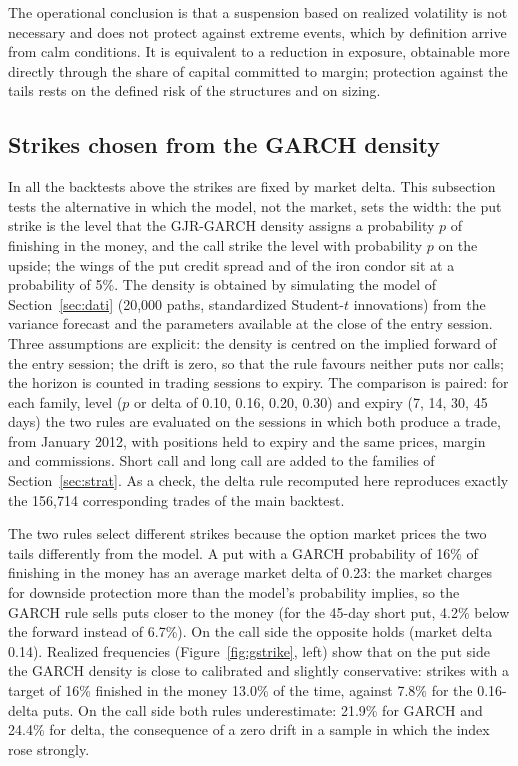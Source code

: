 \documentclass[11pt,a4paper]{article}
\begin{document}
The operational conclusion is that a suspension based on realized volatility is not necessary and does not protect against extreme events, which by definition arrive from calm conditions. It is equivalent to a reduction in exposure, obtainable more directly through the share of capital committed to margin; protection against the tails rests on the defined risk of the structures and on sizing.

\subsection{Strikes chosen from the GARCH density}\label{sec:gstrike}

In all the backtests above the strikes are fixed by market delta. This subsection tests the alternative in which the model, not the market, sets the width: the put strike is the level that the GJR-GARCH density assigns a probability $p$ of finishing in the money, and the call strike the level with probability $p$ on the upside; the wings of the put credit spread and of the iron condor sit at a probability of 5\%. The density is obtained by simulating the model of Section~\ref{sec:dati} (20,000 paths, standardized Student-$t$ innovations) from the variance forecast and the parameters available at the close of the entry session. Three assumptions are explicit: the density is centred on the implied forward of the entry session; the drift is zero, so that the rule favours neither puts nor calls; the horizon is counted in trading sessions to expiry. The comparison is paired: for each family, level ($p$ or delta of 0.10, 0.16, 0.20, 0.30) and expiry (7, 14, 30, 45 days) the two rules are evaluated on the sessions in which both produce a trade, from January 2012, with positions held to expiry and the same prices, margin and commissions. Short call and long call are added to the families of Section~\ref{sec:strat}. As a check, the delta rule recomputed here reproduces exactly the 156,714 corresponding trades of the main backtest.

The two rules select different strikes because the option market prices the two tails differently from the model. A put with a GARCH probability of 16\% of finishing in the money has an average market delta of 0.23: the market charges for downside protection more than the model's probability implies, so the GARCH rule sells puts closer to the money (for the 45-day short put, 4.2\% below the forward instead of 6.7\%). On the call side the opposite holds (market delta 0.14). Realized frequencies (Figure~\ref{fig:gstrike}, left) show that on the put side the GARCH density is close to calibrated and slightly conservative: strikes with a target of 16\% finished in the money 13.0\% of the time, against 7.8\% for the 0.16-delta puts. On the call side both rules underestimate: 21.9\% for GARCH and 24.4\% for delta, the consequence of a zero drift in a sample in which the index rose strongly.
\end{document}
